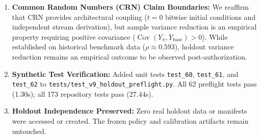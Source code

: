 \documentclass[10pt,a4paper]{article}
\begin{document}
\begin{enumerate}
    \item \textbf{Common Random Numbers (CRN) Claim Boundaries:} We reaffirm that CRN provides architectural coupling ($t=0$ bitwise initial conditions and independent stream derivation), but sample variance reduction is an empirical property requiring positive covariance ($\operatorname{Cov}(Y_\pi, Y_{\text{base}}) > 0$). While established on historical benchmark data ($\rho \approx 0.593$), holdout variance reduction remains an empirical outcome to be observed post-authorization.
    \item \textbf{Synthetic Test Verification:} Added unit tests \texttt{test\_60}, \texttt{test\_61}, and \texttt{test\_62} to \texttt{tests/test\_v9\_holdout\_preflight.py}. All 62 preflight tests pass (1.30s); all 173 repository tests pass (27.44s).
    \item \textbf{Holdout Independence Preserved:} Zero real holdout data or manifests were accessed or created. The frozen policy and calibration artifacts remain untouched.
\end{enumerate}
\end{document}
